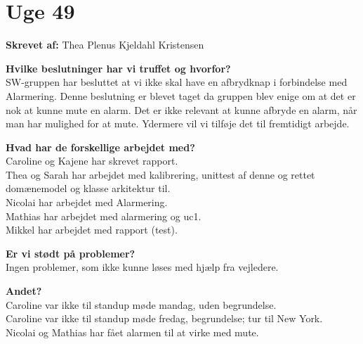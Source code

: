 \section{Uge 49}
\textbf{Skrevet af:} Thea Plenus Kjeldahl Kristensen

\textbf{Hvilke beslutninger har vi truffet og hvorfor?} \\
SW-gruppen har besluttet at vi ikke skal have en afbrydknap i forbindelse med Alarmering. Denne beslutning er blevet taget da gruppen blev enige om at det er nok at kunne mute en alarm. Det er ikke relevant at kunne afbryde en alarm, når man har mulighed for at mute. Ydermere vil vi tilføje det til fremtidigt arbejde. 


\textbf{Hvad har de forskellige arbejdet med?} \\
Caroline og Kajene har skrevet rapport. \\
Thea og Sarah har arbejdet med kalibrering, unittest af denne og rettet domænemodel og klasse arkitektur til. \\
Nicolai har arbejdet med Alarmering. \\
Mathias har arbejdet med alarmering og uc1. \\ 
Mikkel har arbejdet med rapport (test). 

\textbf{Er vi stødt på problemer?} \\
Ingen problemer, som ikke kunne løses med hjælp fra vejledere. 

\textbf{Andet?} \\
Caroline var ikke til standup møde mandag, uden begrundelse. \\ 
Caroline var ikke til standup møde fredag, begrundelse; tur til New York. \\ 
Nicolai og Mathias har fået alarmen til at virke med mute.

\clearpage
